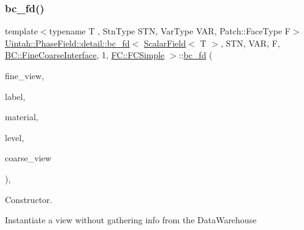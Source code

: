\subsubsection{\texorpdfstring{bc\+\_\+fd()}{bc\_fd()}\hspace{0.1cm}{\footnotesize\ttfamily [2/3]}}
{\footnotesize\ttfamily template$<$typename T , Stn\+Type S\+TN, Var\+Type V\+AR, Patch\+::\+Face\+Type F$>$ \\
\hyperlink{classUintah_1_1PhaseField_1_1detail_1_1bc__fd}{Uintah\+::\+Phase\+Field\+::detail\+::bc\+\_\+fd}$<$ \hyperlink{structUintah_1_1PhaseField_1_1ScalarField}{Scalar\+Field}$<$ T $>$, S\+TN, V\+AR, F, \hyperlink{namespaceUintah_1_1PhaseField_a148fba372aa3be96fd6eede7a2fa10b5ad2d89be9637ff8b537fa4b6026c0e574}{B\+C\+::\+Fine\+Coarse\+Interface}, 1, \hyperlink{namespaceUintah_1_1PhaseField_aeb51fe956fe07f1487f5878f4039f27ca6a316dd1139b99e2a8af86106b3cf045}{F\+C\+::\+F\+C\+Simple} $>$\+::\hyperlink{classUintah_1_1PhaseField_1_1detail_1_1bc__fd}{bc\+\_\+fd} (\begin{DoxyParamCaption}\item[{const \hyperlink{classUintah_1_1PhaseField_1_1detail_1_1view}{view}$<$ \hyperlink{structUintah_1_1PhaseField_1_1ScalarField}{Field} $>$ $\ast$}]{fine\+\_\+view,  }\item[{const Var\+Label $\ast$}]{label,  }\item[{int}]{material,  }\item[{const Level $\ast$}]{level,  }\item[{\hyperlink{classUintah_1_1PhaseField_1_1detail_1_1view}{view}$<$ \hyperlink{structUintah_1_1PhaseField_1_1ScalarField}{Field} $>$ $\ast$}]{coarse\+\_\+view }\end{DoxyParamCaption})\hspace{0.3cm}{\ttfamily [inline]}, {\ttfamily [protected]}}



Constructor. 

Instantiate a view without gathering info from the Data\+Warehouse


